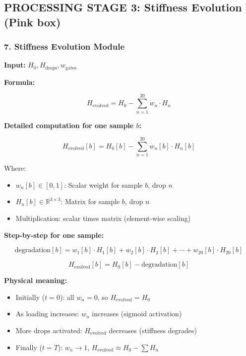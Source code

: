\documentclass[11pt,a4paper]{article}
\begin{document}
\subsection{PROCESSING STAGE 3: Stiffness Evolution (Pink box)}

\subsubsection{7. Stiffness Evolution Module}

\textbf{Input:} $H_0, H_{\text{drops}}, w_{\text{gates}}$

\textbf{Formula:}

\begin{equation}
H_{\text{evolved}} = H_0 - \sum_{n=1}^{20} w_n \cdot H_n
\end{equation}

\textbf{Detailed computation for one sample $b$:}

\begin{equation}
H_{\text{evolved}}[b] = H_0[b] - \sum_{n=1}^{20} w_n[b] \cdot H_n[b]
\end{equation}

Where:
\begin{itemize}
  \item $w_n[b] \in [0, 1]$: Scalar weight for sample $b$, drop $n$
  \item $H_n[b] \in \mathbb{R}^{3 \times 3}$: Matrix for sample $b$, drop $n$
  \item Multiplication: scalar times matrix (element-wise scaling)
\end{itemize}

\textbf{Step-by-step for one sample:}

\begin{equation}
\text{degradation}[b] = w_1[b] \cdot H_1[b] + w_2[b] \cdot H_2[b] + \cdots + w_{20}[b] \cdot H_{20}[b]
\end{equation}

\begin{equation}
H_{\text{evolved}}[b] = H_0[b] - \text{degradation}[b]
\end{equation}

\textbf{Physical meaning:}
\begin{itemize}
  \item Initially ($t=0$): all $w_n = 0$, so $H_{\text{evolved}} = H_0$
  \item As loading increases: $w_n$ increases (sigmoid activation)
  \item More drops activated: $H_{\text{evolved}}$ decreases (stiffness degrades)
  \item Finally ($t=T$): $w_n \to 1$, $H_{\text{evolved}} \approx H_0 - \sum H_n$
\end{itemize}
\end{document}
